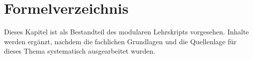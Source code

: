 \chapter{Formelverzeichnis}
\label{chap:a-formelverzeichnis}

Dieses Kapitel ist als Bestandteil des modularen Lehrskripts vorgesehen.
Inhalte werden ergänzt, nachdem die fachlichen Grundlagen und die
Quellenlage für dieses Thema systematisch ausgearbeitet wurden.
